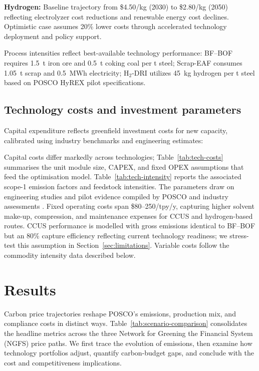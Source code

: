 \documentclass[preprint,1p,authoryear]{elsarticle}
\begin{document}
\textbf{Hydrogen:} Baseline trajectory from \$4.50/kg (2030) to \$2.80/kg (2050) reflecting electrolyzer cost reductions and renewable energy cost declines. Optimistic case assumes 20\% lower costs through accelerated technology deployment and policy support.

Process intensities reflect best-available technology performance: BF--BOF requires 1.5~t iron ore and 0.5~t coking coal per t steel; Scrap-EAF consumes 1.05~t scrap and 0.5~MWh electricity; H$_2$-DRI utilizes 45~kg hydrogen per t steel based on POSCO HyREX pilot specifications.

\subsection{Technology costs and investment parameters}

Capital expenditure reflects greenfield investment costs for new capacity, calibrated using industry benchmarks and engineering estimates:

Capital costs differ markedly across technologies; Table~\ref{tab:tech-costs} summarises the unit module size, CAPEX, and fixed OPEX assumptions that feed the optimisation model. Table~\ref{tab:tech-intensity} reports the associated scope-1 emission factors and feedstock intensities. The parameters draw on engineering studies and pilot evidence compiled by POSCO and industry assessments \citep{MaterialEconomics2019,kuramochi2018beyond,prammer2021steel}. Fixed operating costs span \$80--250/tpy/y, capturing higher solvent make-up, compression, and maintenance expenses for CCUS and hydrogen-based routes. CCUS performance is modelled with gross emissions identical to BF--BOF but an 80\% capture efficiency reflecting current technology readiness; we stress-test this assumption in Section~\ref{sec:limitations}. Variable costs follow the commodity intensity data described below.





\section{Results}

Carbon price trajectories reshape POSCO's emissions, production mix, and compliance costs in distinct ways. Table~\ref{tab:scenario-comparison} consolidates the headline metrics across the three Network for Greening the Financial System (NGFS) price paths. We first trace the evolution of emissions, then examine how technology portfolios adjust, quantify carbon-budget gaps, and conclude with the cost and competitiveness implications.
\end{document}
